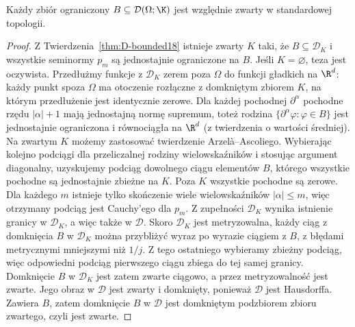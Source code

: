 \begin{twierdzenie}
\label{thm:D-Montel18}
Każdy zbiór ograniczony $B\subseteq\mathcal D(\Omega;\K)$
jest względnie zwarty w standardowej topologii.
\end{twierdzenie}
\begin{proof}
Z Twierdzenia~\ref{thm:D-bounded18} istnieje zwarty $K$
taki, że $B\subseteq\mathcal D_K$ i wszystkie seminormy
$p_m$ są jednostajnie ograniczone na $B$.
Jeśli $K=\varnothing$, teza jest oczywista.
Przedłużmy funkcje z $\mathcal D_K$ zerem poza $\Omega$
do funkcji gładkich na $\R^d$: każdy punkt spoza $\Omega$
ma otoczenie rozłączne z domkniętym zbiorem $K$,
na którym przedłużenie jest identycznie zerowe. Dla każdej pochodnej
$\partial^\alpha$ pochodne rzędu $|\alpha|+1$ mają
jednostajną normę supremum, toteż rodzina
$\{\partial^\alpha\varphi:\varphi\in B\}$ jest
jednostajnie ograniczona i równociągła na $\R^d$
(z twierdzenia o wartości średniej). Na zwartym $K$
możemy zastosować twierdzenie Arzel\`a--Ascoliego.
Wybierając kolejno podciągi dla przeliczalnej rodziny
wielowskaźników i stosując argument diagonalny,
uzyskujemy podciąg dowolnego ciągu elementów $B$,
którego wszystkie pochodne są jednostajnie zbieżne na $K$.
Poza $K$ wszystkie pochodne są zerowe. Dla każdego $m$
istnieje tylko skończenie wiele wielowskaźników $|\alpha|\le m$,
więc otrzymany podciąg jest Cauchy'ego dla $p_m$.
Z zupełności $\mathcal D_K$ wynika istnienie granicy w $\mathcal D_K$, a więc także
w $\mathcal D$. Skoro $\mathcal D_K$ jest metryzowalna,
każdy ciąg z domknięcia $B$ w $\mathcal D_K$ można
przybliżyć wyraz po wyrazie ciągiem z $B$, z błędami
metrycznymi mniejszymi niż $1/j$. Z tego ostatniego
wybieramy zbieżny podciąg, więc odpowiedni podciąg
pierwszego ciągu zbiega do tej samej granicy.
Domknięcie $B$ w $\mathcal D_K$ jest zatem zwarte ciągowo,
a przez metryzowalność jest zwarte. Jego obraz w $\mathcal D$
jest zwarty i domknięty, ponieważ $\mathcal D$ jest Hausdorffa.
Zawiera $B$, zatem domknięcie $B$ w $\mathcal D$ jest
domkniętym podzbiorem zbioru zwartego, czyli jest zwarte.
\end{proof}

